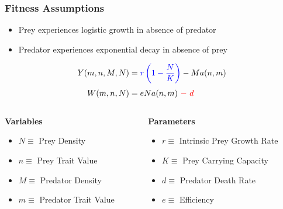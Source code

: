 \documentclass[10pt]{beamer}
\begin{document}
\begin{frame}
	\frametitle{Fitness Assumptions}
	\begin{itemize}
		\item Prey experiences {\color{blue}logistic growth} in absence of predator
		\item Predator experiences {\color{red} exponential decay} in absence of prey
	\end{itemize}
	\begin{align*}
		Y(m, n, M, N) &= {\color{blue}r\left(1 - \frac{N}{K}\right)} - Ma(n, m) \\[.1cm]
		W(m, n, N) &= eNa(n, m)\ {\color{red} -\ d}
	\end{align*}
	\begin{columns}
		\begin{column}{0.45\textwidth}
			{\bf Variables}
			\begin{itemize}
				\item $N \equiv $ Prey Density
				\item $n \equiv $ Prey Trait Value
				\item $M \equiv $ Predator Density
				\item $m \equiv $ Predator Trait Value
			\end{itemize}
		\end{column}
		\begin{column}{0.5\textwidth}
			{\bf Parameters}
			\begin{itemize}
				\item {\color{blue}$r \equiv $ Intrinsic Prey Growth Rate}
				\item {\color{blue}$K \equiv $ Prey Carrying Capacity}
				\item {\color{red}$d \equiv $ Predator Death Rate}
				\item $e \equiv $ Efficiency
			\end{itemize}
		\end{column}
	\end{columns}
\end{frame}
\end{document}
